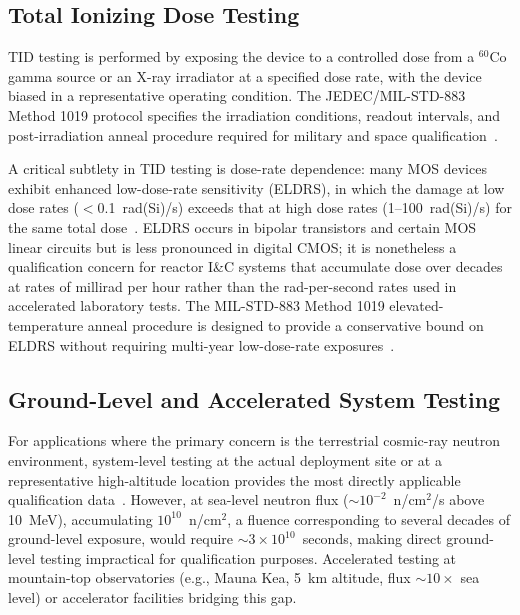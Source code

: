 \subsection{Total Ionizing Dose Testing}

TID testing is performed by exposing the device to a
controlled dose from a $^{60}$Co gamma source or an X-ray
irradiator at a specified dose rate, with the device biased
in a representative operating condition.  The JEDEC/MIL-STD-883
Method 1019 protocol specifies the irradiation conditions,
readout intervals, and post-irradiation anneal procedure
required for military and space qualification~\cite{schwank2013radiation}.

A critical subtlety in TID testing is dose-rate dependence:
many MOS devices exhibit enhanced low-dose-rate sensitivity
(ELDRS), in which the damage at low dose rates ($<$0.1~rad(Si)/s)
exceeds that at high dose rates (1--100~rad(Si)/s) for the
same total dose~\cite{fleetwood2013total}.  ELDRS occurs in
bipolar transistors and certain MOS linear circuits but is
less pronounced in digital CMOS; it is nonetheless a
qualification concern for reactor I\&C systems that accumulate
dose over decades at rates of millirad per hour rather than
the rad-per-second rates used in accelerated laboratory tests.
The MIL-STD-883 Method 1019 elevated-temperature anneal
procedure is designed to provide a conservative bound on
ELDRS without requiring multi-year low-dose-rate
exposures~\cite{shaneyfelt2008qualification}.

\subsection{Ground-Level and Accelerated System Testing}

For applications where the primary concern is the
terrestrial cosmic-ray neutron environment, system-level
testing at the actual deployment site or at a representative
high-altitude location provides the most directly applicable
qualification data~\cite{coronetti2021systemlevel}.  However,
at sea-level neutron flux ($\sim 10^{-2}$~n/cm$^2$/s above
10~MeV), accumulating $10^{10}$~n/cm$^2$, a fluence corresponding
to several decades of ground-level exposure, would require
$\sim 3 \times 10^{10}$~seconds, making direct ground-level
testing impractical for qualification purposes.  Accelerated
testing at mountain-top observatories (e.g., Mauna Kea,
5~km altitude, flux $\sim 10\times$ sea level) or accelerator
facilities bridging this gap.

